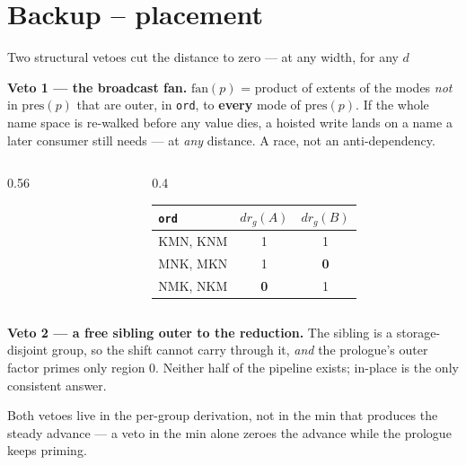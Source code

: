 \documentclass[aspectratio=169,9pt]{beamer}
\newcommand{\tsub}[1]{{\footnotesize\color{gray}#1}}
\newcommand{\key}[1]{\textcolor{acc}{\textbf{#1}}}
\newcommand{\bad}[1]{\textcolor{warn}{\textbf{#1}}}
\newcommand{\good}[1]{\textcolor{ok}{\textbf{#1}}}
\begin{document}
\section{Backup -- placement}
\begin{frame}{Two structural vetoes cut the distance to zero --- at any width, for any $d$}

\textbf{Veto 1 --- the broadcast fan.} $\mathrm{fan}(p)$ = product of extents of the modes \emph{not} in
$\mathrm{pres}(p)$ that are outer, in \texttt{ord}, to \key{every} mode of $\mathrm{pres}(p)$. If the
whole name space is re-walked before any value dies, a hoisted write lands on a name a later consumer
still needs --- at \emph{any} distance. A race, not an anti-dependency.

\begin{columns}[T]
\begin{column}{0.56\textwidth}
\end{column}
\begin{column}{0.4\textwidth}
\begin{center}\scriptsize
\begin{tabular}{lcc}
\toprule
\texttt{ord} & $dr_g(A)$ & $dr_g(B)$ \\
\midrule
KMN, KNM & 1 & 1 \\
MNK, MKN & 1 & \bad{0} \\
NMK, NKM & \bad{0} & 1 \\
\bottomrule
\end{tabular}
\end{center}
\end{column}
\end{columns}

\vspace{1mm}
\textbf{Veto 2 --- a free sibling outer to the reduction.} The sibling is a storage-disjoint group, so
the shift cannot carry through it, \emph{and} the prologue's outer factor primes only region 0. Neither
half of the pipeline exists; in-place is the only consistent answer.

\tsub{Both vetoes live in the per-group derivation, not in the min that produces the steady advance --- a veto in the min alone zeroes the advance while the prologue keeps priming.}
\end{frame}
\end{document}
